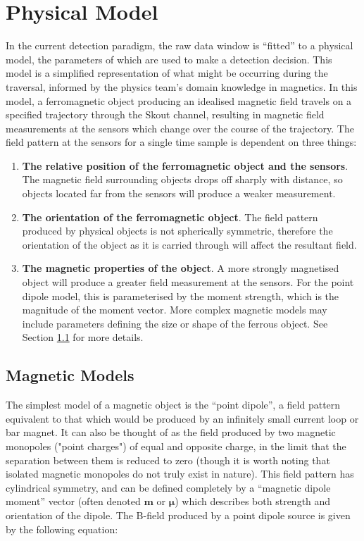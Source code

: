 \documentclass[10pt, a4paper, twocolumn]{article} %
\begin{document}

\section{Physical Model}

In the current detection paradigm, the raw data window is “fitted” to a physical model, the parameters of which are used to make a detection decision. This model is a simplified representation of what might be occurring during the traversal, informed by the physics team's domain knowledge in magnetics. In this model, a ferromagnetic object producing an idealised magnetic field travels on a specified trajectory through the Skout channel, resulting in magnetic field measurements at the sensors which change over the course of the trajectory. The field pattern at the sensors for a single time sample is dependent on three things:

\begin{enumerate}
	\item \textbf{The relative position of the ferromagnetic object and the sensors}. The magnetic field surrounding objects drops off sharply with distance, so objects located far from the sensors will produce a weaker measurement.
	
	\item \textbf{The orientation of the ferromagnetic object}. The field pattern produced by physical objects is not spherically symmetric, therefore the orientation of the object as it is carried through will affect the resultant field.
	
	\item \textbf{The magnetic properties of the object}. A more strongly magnetised object will produce a greater field measurement at the sensors. For the point dipole model, this is parameterised by the moment strength, which is the magnitude of the moment vector. More complex magnetic models may include parameters defining the size or shape of the ferrous object. See Section \ref{Mag_models} for more details.
\end{enumerate}

\subsection{Magnetic Models}
\label{Mag_models}

The simplest model of a magnetic object is the “point dipole”, a field pattern equivalent to that which would be produced by an infinitely small current loop or bar magnet. It can also be thought of as the field produced by two magnetic monopoles ("point charges") of equal and opposite charge, in the limit that the separation between them is reduced to zero (though it is worth noting that isolated magnetic monopoles do not truly exist in nature). This field pattern has cylindrical symmetry, and can be defined completely by a “magnetic dipole moment” vector (often denoted $\mathbf{m}$ or $\boldsymbol{\mu}$) which describes both strength and orientation of the dipole. The B-field produced by a point dipole source is given by the following equation:
\end{document}

